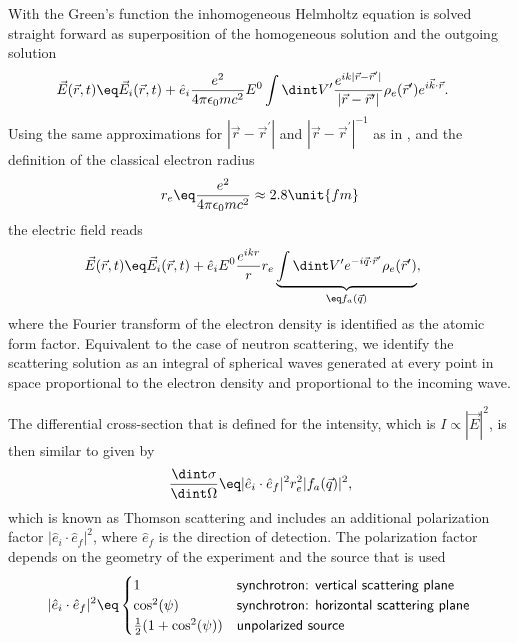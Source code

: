 \documentclass[\main/dresen_thesis.tex]{subfiles}
\begin{document}
With the Green's function the inhomogeneous Helmholtz equation is solved straight forward as superposition of the homogeneous solution and the outgoing solution
\begin{align}
  \vec{E} (\vec{r}, t) \eq& \vec{E}_i(\vec{r}, t) + \hat{e}_i \frac{e^2}{4\pi \epsilon_0 m c^2} E^0 \int \dint V^\prime \frac{e^{i k |\vec{r} - \vec{r}^\prime|}}{|\vec{r} - \vec{r}^\prime|} \rho_e (\vec{r}^\prime) e^{i\vec{k}\cdot \vec{r}}.
\end{align}
Using the same approximations for $|\vec{r} - \vec{r}^\prime|$ and $|\vec{r} - \vec{r}^\prime|^{-1}$ as in , and the definition of the classical electron radius
\begin{align}
  r_e \eq \frac{e^2}{4\pi \epsilon_0 m c^2} \approx 2.8 \unit{fm}
\end{align}
the electric field reads
\begin{align}
  \vec{E} (\vec{r}, t) \eq& \vec{E}_i(\vec{r}, t) + \hat{e}_i E^0   \frac{e^{ik r}}{r} r_e \underbrace{\int \dint V^\prime e^{-i \vec{q} \cdot  \vec{r}^\prime}  \rho_e (\vec{r}^\prime)}_{\eq f_a(\vec{q})},
\end{align}
where the Fourier transform of the electron density is identified as the atomic form factor.
Equivalent to the case of neutron scattering, we identify the scattering solution as an integral of spherical waves generated at every point in space proportional to the electron density and proportional to the incoming wave.

The differential cross-section that is defined for the intensity, which is $I \propto |\vec{E}|^2$, is then similar to  given by
\begin{align}
  \frac{\dint \sigma}{\dint \Omega} \eq |\hat{e}_i \cdot \hat{e}_f|^2 r_e^2 |f_a(\vec{q})|^2,
\end{align}
which is known as Thomson scattering and includes an additional polarization factor $|\hat{e}_i \cdot \hat{e}_f|^2$, where $\hat{e}_f$ is the direction of detection.
The polarization factor depends on the geometry of the experiment and the source that is used \cite{AlsNielsen_2011_Eleme}
\begin{align}
  |\hat{e}_i \cdot \hat{e}_f|^2 \eq \begin{cases}
    1 & \textsf{synchrotron: vertical scattering plane} \\
    \cos^2(\psi) & \textsf{synchrotron: horizontal scattering plane}\\
    \frac{1}{2} (1+\cos^2(\psi)) & \textsf{unpolarized source}
  \end{cases}
\end{align}
\end{document}
